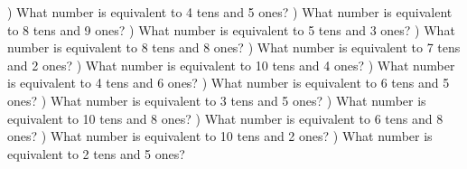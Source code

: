 \documentclass{article}%
\begin{document}
) What number is equivalent to 4 tens and 5 ones?%
\newline%
\newline%
) What number is equivalent to 8 tens and 9 ones?%
\newline%
\newline%
) What number is equivalent to 5 tens and 3 ones?%
\newline%
\newline%
) What number is equivalent to 8 tens and 8 ones?%
\newline%
\newline%
) What number is equivalent to 7 tens and 2 ones?%
\newline%
\newline%
) What number is equivalent to 10 tens and 4 ones?%
\newline%
\newline%
) What number is equivalent to 4 tens and 6 ones?%
\newline%
\newline%
) What number is equivalent to 6 tens and 5 ones?%
\newline%
\newline%
) What number is equivalent to 3 tens and 5 ones?%
\newline%
\newline%
) What number is equivalent to 10 tens and 8 ones?%
\newline%
\newline%
) What number is equivalent to 6 tens and 8 ones?%
\newline%
\newline%
) What number is equivalent to 10 tens and 2 ones?%
\newline%
\newline%
) What number is equivalent to 2 tens and 5 ones?%
\newline%
\newline%
\end{document}
